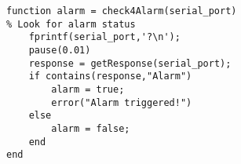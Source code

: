 \begin{lstlisting}
function alarm = check4Alarm(serial_port)
% Look for alarm status
    fprintf(serial_port,'?\n');
    pause(0.01)
    response = getResponse(serial_port);
    if contains(response,"Alarm")
        alarm = true;
        error("Alarm triggered!")
    else
        alarm = false;
    end
end

\end{lstlisting}